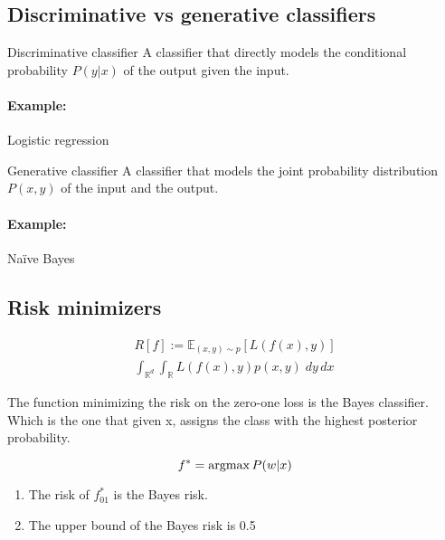 \subsection{Discriminative vs generative classifiers}

\begin{definition}{Discriminative classifier}{}
	A classifier that directly models the conditional probability
	\(P(y | x)\) of the output given the input.

	\paragraph{Example:} Logistic regression
\end{definition}

\begin{definition}{Generative classifier}{}
	A classifier that models the joint probability distribution
	\(P(x, y)\) of the input and the output.

	\paragraph{Example:} Naïve Bayes
\end{definition}

\subsection{Risk minimizers}

\begin{align*}
	R[f] := \mathds{E}_{(x, y) \sim p} [ L(f(x), y) ] \\
	\int_{\mathds{R}^d} \int_{\mathds{R}} L(f(x), y) p(x, y)\; dy\, dx
\end{align*}

\begin{prop}{}{}

	The function minimizing the risk on the zero-one loss is the Bayes
	classifier. Which is the one that given x, assigns the class with the
	highest posterior probability.

	\[f^* = \operatorname{argmax} {P(w | x)}\]

	\begin{enumerate}
		\item The risk of \(f_{01}^*\) is the Bayes risk.
		\item The upper bound of the Bayes risk is 0.5
	\end{enumerate}

\end{prop}

